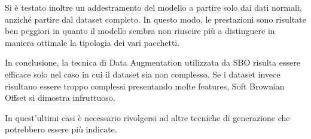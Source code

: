 Si è testato inoltre un addestramento del modello a partire solo dai dati normali, anziché partire dal dataset completo. In questo modo, le prestazioni sono risultate ben peggiori in quanto il modello sembra non riuscire più a distinguere in maniera ottimale la tipologia dei vari pacchetti.

In conclusione, la tecnica di Data Augmentation utilizzata da SBO risulta essere efficace solo nel caso in cui il dataset sia non complesso. Se i dataset invece risultano essere troppo complessi presentando molte features, Soft Brownian Offset si dimostra infruttuoso.

In quest'ultimi casi è necessario rivolgersi ad altre tecniche di generazione che potrebbero essere più indicate.
